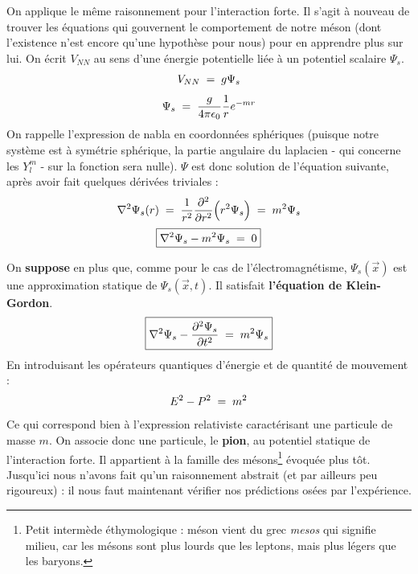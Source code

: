 On applique le même raisonnement pour l'interaction forte. Il s'agit à nouveau de trouver les équations qui gouvernent le comportement de notre méson (dont l'existence n'est encore qu'une hypothèse pour nous) pour en apprendre plus sur lui. On écrit $V_{NN}$ au sens d'une énergie potentielle liée à un potentiel scalaire $\Psi_s$.
\begin{equation*}
    V_{NN} \; = \; g\Psi_s
\end{equation*}
\begin{equation*}
    \Psi_s \; = \; \dfrac{g}{4\pi\epsilon_0}\dfrac{1}{r}e^{-mr}
\end{equation*}
On rappelle l'expression de nabla en coordonnées sphériques (puisque notre système est à symétrie sphérique, la partie angulaire du laplacien - qui concerne les $Y^m_l$ - sur la fonction sera nulle). $\Psi$ est donc solution de l'équation suivante, après avoir fait quelques dérivées triviales :
\begin{equation*}
    \nabla^2\Psi_s(r) 
    \; = \; \dfrac{1}{r^2}\dfrac{\partial^2}{\partial r^2}\Big(r^2 \Psi_s\Big)
    \; = \; m^2 \Psi_s
\end{equation*}
\begin{equation*}
    \boxed{
        \nabla^2 \Psi_s - m^2\Psi_s \; = \; 0
    }
\end{equation*}

On \textbf{suppose} en plus que, comme pour le cas de l'électromagnétisme, $\Psi_s(\Vec{x})$ est une approximation statique de $\Psi_s(\Vec{x},t)$. Il satisfait \textbf{l'équation de Klein-Gordon}.
\begin{equation*}
    \boxed{
        \nabla^2\Psi_s - \dfrac{\partial^2\Psi_s}{\partial t^2} \; = \; m^2 \Psi_s
    }
\end{equation*}
En introduisant les opérateurs quantiques d'énergie et de quantité de mouvement :
\begin{equation*}
    E^2 - P^2 \; = \; m^2
\end{equation*}
Ce qui correspond bien à l'expression relativiste caractérisant une particule de masse $m$. On associe donc une particule, le \textbf{pion}, au potentiel statique de l'interaction forte. Il appartient à la famille des mésons\footnote{Petit intermède éthymologique : méson vient du grec \emph{mesos} qui signifie milieu, car les mésons sont plus lourds que les leptons, mais plus légers que les baryons.} évoquée plus tôt. Jusqu'ici nous n'avons fait qu'un raisonnement abstrait (et par ailleurs peu rigoureux) : il nous faut maintenant vérifier nos prédictions osées par l'expérience.\\



